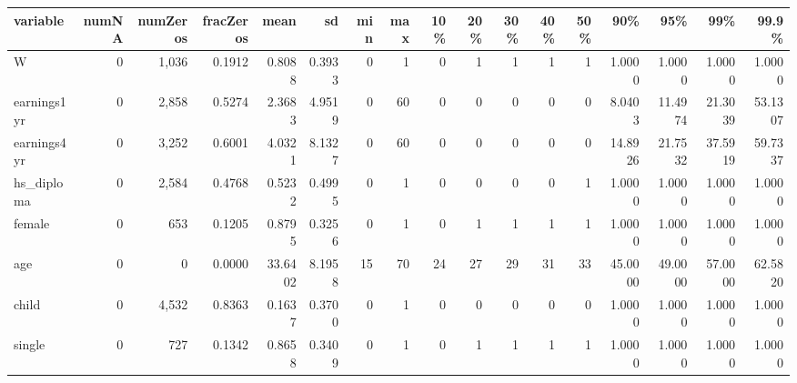 
\begin{tabular}{lrrrrrrrrrrrrrrrr}
\toprule
variable & numNA & numZeros & fracZeros & mean & sd & min & max & 10\% & 20\% & 30\% & 40\% & 50\% & 90\% & 95\% & 99\% & 99.9\%\\
\midrule
W & 0 & 1,036 & 0.1912 & 0.8088 & 0.3933 & 0 & 1 & 0 & 1 & 1 & 1 & 1 & 1.0000 & 1.0000 & 1.0000 & 1.0000\\
earnings1yr & 0 & 2,858 & 0.5274 & 2.3683 & 4.9519 & 0 & 60 & 0 & 0 & 0 & 0 & 0 & 8.0403 & 11.4974 & 21.3039 & 53.1307\\
earnings4yr & 0 & 3,252 & 0.6001 & 4.0321 & 8.1327 & 0 & 60 & 0 & 0 & 0 & 0 & 0 & 14.8926 & 21.7532 & 37.5919 & 59.7337\\
hs\_diploma & 0 & 2,584 & 0.4768 & 0.5232 & 0.4995 & 0 & 1 & 0 & 0 & 0 & 0 & 1 & 1.0000 & 1.0000 & 1.0000 & 1.0000\\
female & 0 & 653 & 0.1205 & 0.8795 & 0.3256 & 0 & 1 & 0 & 1 & 1 & 1 & 1 & 1.0000 & 1.0000 & 1.0000 & 1.0000\\
\addlinespace
age & 0 & 0 & 0.0000 & 33.6402 & 8.1958 & 15 & 70 & 24 & 27 & 29 & 31 & 33 & 45.0000 & 49.0000 & 57.0000 & 62.5820\\
child & 0 & 4,532 & 0.8363 & 0.1637 & 0.3700 & 0 & 1 & 0 & 0 & 0 & 0 & 0 & 1.0000 & 1.0000 & 1.0000 & 1.0000\\
single & 0 & 727 & 0.1342 & 0.8658 & 0.3409 & 0 & 1 & 0 & 1 & 1 & 1 & 1 & 1.0000 & 1.0000 & 1.0000 & 1.0000\\
\bottomrule
\end{tabular}
